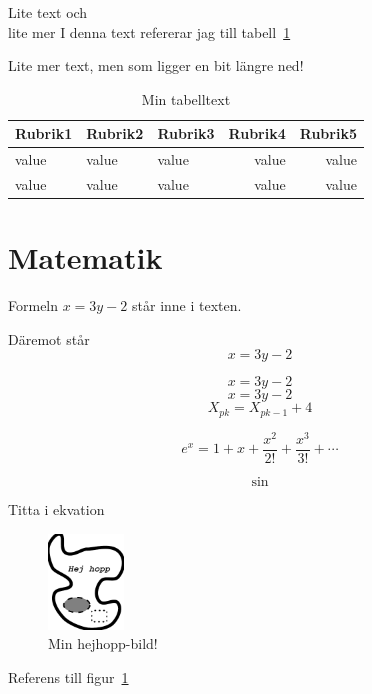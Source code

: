 \documentclass[a4paper]{article}
\begin{document}
Lite text och \\ lite mer
I denna text refererar jag till tabell~\ref{tab4}

\bigskip

Lite mer text, men som ligger en bit längre ned!

\begin{table}
\begin{tabular}{lllrr}
Rubrik1 & Rubrik2 & Rubrik3 & Rubrik4&      Rubrik5 \\
\hline
value&value & value & value & value \\
value & value & value & value & value  
\end{tabular}
\caption{Min tabelltext}
\label{tab4}
\end{table}

\section{Matematik}

Formeln $x = 3y - 2$ står inne i texten.

Däremot står
\begin{displaymath}
	x=3y-2
\end{displaymath}

\begin{equation}
	x=3y-2
	\label{eq1}
\end{equation}
\begin{equation}
	x=3y-2
	\label{eq2}
\end{equation}
\begin{equation}
	X_{pk} = X_{pk-1} + 4
	\label{eq3}
\end{equation}


\begin{equation}
	e^x = 1 + x + \frac{x^2}{2!} + \frac{x^3}{3!} + \cdots
\end{equation}

\begin{equation}
	\sin
\end{equation}

Titta i ekvation

\begin{figure}
\includegraphics[width=2cm]{../images/bild}
\caption{Min hejhopp-bild!}
\label{hejhopp}
\end{figure}

Referens till figur~\ref{hejhopp}
\end{document}
